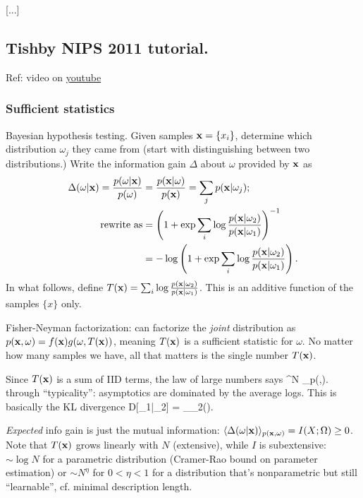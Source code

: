 \documentclass[notitlepage,openany,11pt]{report}
\numberwithin{equation}{section}
\theoremstyle{plain}%
\begin{document}
[...]

\subsection{Tishby NIPS 2011 tutorial.} Ref: video on \href{https://www.youtube.com/watch?v=GKm53xGbAOk}{youtube}

\subsubsection{Sufficient statistics}
Bayesian hypothesis testing. Given samples $\mathbf{x} = \{x_{i}\}$, determine which distribution $\omega_{j}$ they came from (start with distinguishing between two distributions.) Write the information gain $\Delta$ about $\omega$ provided by $\mathbf{x}$ as
\begin{align*}
\Delta(\omega|\mathbf{x}) = \frac{p(\omega|\mathbf{x})}{p(\omega)} &= \frac{p(\mathbf{x}|\omega)}{p(\mathbf{x})} = \sum_{j}p(\mathbf{x}|\omega_{j}); \\
\text{rewrite as}   &= \left( 1+ \exp \sum_{i} \log \frac{p(\mathbf{x}|\omega_{2})}{p(\mathbf{x}|\omega_{1})} \right)^{-1} \\
&= - \log \left( 1 + \exp \sum_{i} \log \frac{p(\mathbf{x}|\omega_{2})}{p(\mathbf{x}|\omega_{1})} \right).
\end{align*}
In what follows, define $T(\mathbf{x}) = \sum_{i} \log \frac{p(\mathbf{x}|\omega_{2})}{p(\mathbf{x}|\omega_{1})}$. This is an additive function of the samples $\{x\}$ only.

Fisher-Neyman factorization: can factorize the \emph{joint} distribution as $p(\mathbf{x},\omega) = f(\mathbf{x})g(\omega, T(\mathbf{x}))$, meaning $T(\mathbf{x})$ is a sufficient statistic for $\omega$. No matter how many samples we have, all that matters is the single number $T(\mathbf{x})$. 

Since $T(\mathbf{x})$ is a sum of IID terms, the law of large numbers says 
\be
{} \sum^{N} \log {} 
\left\langle \log {} \right\rangle_{p(,\omega)}.
\ee
through ``typicality'': asymptotics are dominated by the average logs. This is basically the KL divergence
 \leq D[\omega_{1}|\omega_{2}] = \left\langle \log {} \right\rangle_{\omega_{2}()}.
\ee

\emph{Expected} info gain is just the mutual information: $\langle \Delta(\omega|\mathbf{x}) \rangle_{p(\mathbf{x}, \omega)} = I(X; \Omega) \geq 0$. Note that $T(\mathbf{x})$ grows linearly with $N$ (extensive), while $I$ is subextensive: $\sim \log N$ for a parametric distribution (Cramer-Rao bound on parameter estimation) or $\sim N^{\eta}$ for $0 < \eta < 1$ for a distribution that's nonparametric but still ``learnable'', cf. minimal description length. 
\end{document}
